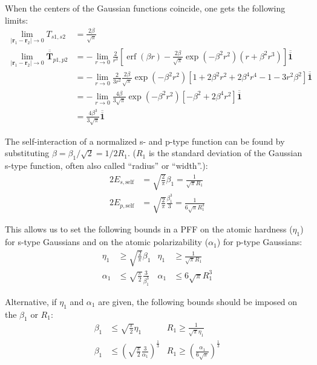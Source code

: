 \documentclass[a4paper,12pt,parskip=half]{scrartcl}
\newcommand*{\tensor}[1]{\overline{\overline{\mathbold{#1}}}}
\DeclareMathOperator{\erf}{erf}
\begin{document}
When the centers of the Gaussian functions coincide, one gets the following limits:
%
\begin{align}
    \lim_{|\mathbold{r}_1 - \mathbold{r}_2| \rightarrow 0} T_{s1,s2} &= \frac{2 \beta}{\sqrt{\pi}} \\
    \lim_{|\mathbold{r}_1 - \mathbold{r}_2| \rightarrow 0} \tensor{T}_{p1,p2}
        &= -\lim_{r\rightarrow 0} \frac{2}{r^3} \left[
            \erf(\beta r) - \frac{2\beta}{\sqrt{\pi}} \exp(-\beta^2 r^2) (r + \beta^2 r^3)
           \right] \tensor{1} \\
        &= -\lim_{r\rightarrow 0} \frac{2}{3r^2} \frac{2\beta}{\sqrt{\pi}} \exp(-\beta^2 r^2) \left[
            1
            + 2\beta^2 r^2 + 2 \beta^4 r^4
            - 1 - 3r^2\beta^2
           \right] \tensor{1} \\
        &= -\lim_{r\rightarrow 0} \frac{4\beta}{3\sqrt{\pi}} \exp(-\beta^2 r^2) \left[
            -\beta^2 + 2\beta^4 r^2
           \right] \tensor{1} \\
        &= \frac{4 \beta^3}{3 \sqrt{\pi}} \tensor{1}
\end{align}

The self-interaction of a normalized s- and p-type function can be found by substituting $\beta = \beta_1 / \sqrt{2} = 1/2R_1$. ($R_1$ is the standard deviation of the Gaussian s-type function, often also called ``radius'' or ``width''.):
%
\begin{align}
    \label{eq:ss_limit}
    2 E_{s,\text{self}} &= \sqrt{\frac{2}{\pi}} \beta_1 = \frac{1}{\sqrt{\pi}R_1} \\
    \label{eq:pp_limit}
    2 E_{p,\text{self}} &= \sqrt{\frac{2}{\pi}} \frac{\beta_1^3}{3} = \frac{1}{6\sqrt{\pi}R_1^3}
\end{align}

This allows us to set the following bounds in a PFF on the atomic hardness ($\eta_1$) for s-type Gaussians and on the atomic polarizability ($\alpha_1$) for p-type Gaussians:
%
\begin{align}
    \eta_1 &\ge \sqrt{\frac{2}{\pi}} \beta_1
        & \eta_1 &\ge \frac{1}{\sqrt{\pi} R_1} \\
    \alpha_1 &\le \sqrt{\frac{\pi}{2}} \frac{3}{\beta_1^3}
        & \alpha_1 &\le 6\sqrt{\pi} R_1^3
\end{align}

Alternative, if $\eta_1$ and $\alpha_1$ are given, the following bounds should be imposed on the $\beta_1$ or $R_1$:
%
\begin{align}
    \beta_1 &\le \sqrt{\frac{\pi}{2}} \eta_1
        & R_1 \ge \frac{1}{\sqrt{\pi} \eta_1} \\
    \label{eq:bound_radii_pp}
    \beta_1 &\le \left(\sqrt{\frac{\pi}{2}} \frac{3}{\alpha_1}\right)^{\frac{1}{3}}
        & R_1 \ge \left(\frac{\alpha_1}{6 \sqrt{\pi}}\right)^{\frac{1}{3}}
\end{align}
\end{document}
